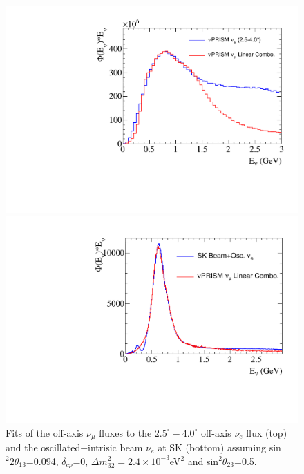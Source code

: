 \begin{figure}[htpb]
\begin{center}
  \begin{minipage}[t]{.47\textwidth}
    \begin{center}
      \includegraphics[width=\textwidth] {figures/nuprism_nue_fit.pdf}
    \end{center}
  \end{minipage}
  \begin{minipage}[t]{.47\textwidth}
    \begin{center}
      \includegraphics[width=\textwidth] {figures/sk_nue_fit.pdf}
    \end{center}
  \end{minipage}
\end{center}
\caption{Fits of the off-axis \nuprism $\nu_{\mu}$ fluxes to the \nuprism $2.5^{\circ}-4.0^{\circ}$ off-axis $\nu_e$ flux (top) and the oscillated+intrisic beam $\nu_e$ at SK (bottom) assuming sin$^{2}2\theta_{13}$=0.094, $\delta_{cp}$=0, $\Delta m^{2}_{32}=2.4\times10^{-3}$eV$^{2}$ and sin$^{2}\theta_{23}$=0.5. }
\label{fig:nuefluxfits}
\end{figure}


